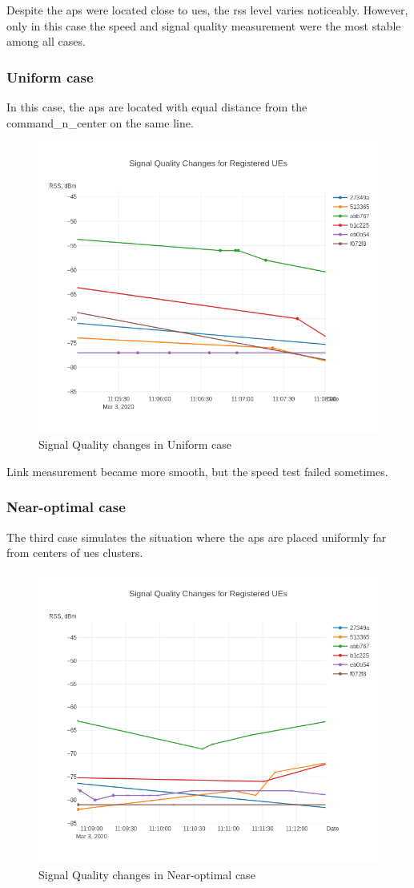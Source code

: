 Despite the \glspl{ap} were located close to \glspl{ue}, the \gls{rss} level varies noticeably. However, only in this case the speed and signal quality measurement were the most stable among all cases.

\subsubsection{Uniform case}

In this case, the \glspl{ap} are located with equal distance from the \gls{command_n_center} on the same line.

\begin{figure}[H]
	\centering
	\includegraphics[width=0.5\linewidth,keepaspectratio]{images/Exp4_Uniform.png}
\caption{Signal Quality changes in Uniform case}
\end{figure}

Link measurement became more smooth, but the speed test failed
sometimes.

\subsubsection{Near-optimal case}

The third case simulates the situation where the \glspl{ap} are placed
uniformly far from centers of \glspl{ue} clusters.

\begin{figure}[H]
	\centering
	\includegraphics[width=0.5\linewidth,keepaspectratio]{images/Exp4_Near_Optimal.png}
\caption{Signal Quality changes in Near-optimal case}
\end{figure}

